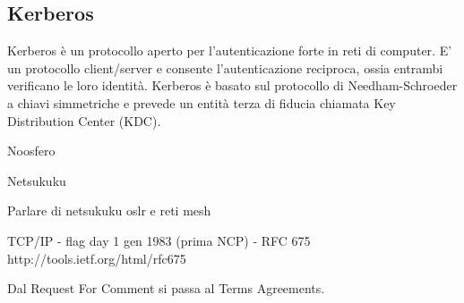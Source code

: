 \subsection{Kerberos}
Kerberos è un protocollo aperto per l'autenticazione forte in reti di
computer. E' un protocollo client/server e consente l'autenticazione
reciproca, ossia entrambi verificano le loro identità. Kerberos è
basato sul protocollo di Needham-Schroeder a chiavi simmetriche e
prevede un entità terza di fiducia chiamata Key Distribution Center
(KDC).


Noosfero

Netsukuku


Parlare di netsukuku oslr e reti mesh 

TCP/IP - flag day 1 gen 1983 (prima NCP) - RFC 675
http://tools.ietf.org/html/rfc675

Dal Request For Comment si passa al Terms Agreements.
